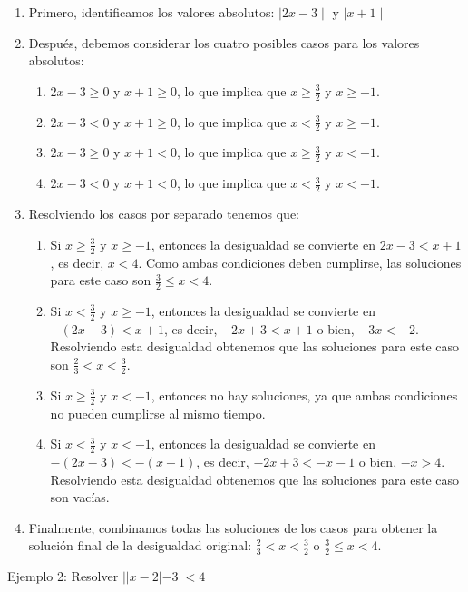 \documentclass[a4paper,12pt]{article}
\begin{document}
\begin{enumerate}
	\item Primero, identificamos los valores absolutos: $ \mid 2x - 3 \mid $ y $ \mid x + 1 \mid $
	
	\item Después, debemos considerar los cuatro posibles casos para los valores absolutos:
		\begin{enumerate}
			\item $2x-3\geq0$ y $x+1\geq0$, lo que implica que $x\geq\frac{3}{2}$ y $x\geq-1$.
			\item $2x-3<0$ y $x+1\geq0$, lo que implica que $x<\frac{3}{2}$ y $x\geq-1$.
			\item $2x-3\geq0$ y $x+1<0$, lo que implica que $x\geq\frac{3}{2}$ y $x<-1$.
			\item $2x-3<0$ y $x+1<0$, lo que implica que $x<\frac{3}{2}$ y $x<-1$.
		\end{enumerate}
	
	\item Resolviendo los casos por separado tenemos que:
		\begin{enumerate}
			\item Si $x\geq\frac{3}{2}$ y $x\geq-1$, entonces la desigualdad se convierte en $2x-3<x+1$, es decir, $x<4$. Como ambas condiciones deben cumplirse, las soluciones para este caso son $\frac{3}{2}\leq x<4$.
			\item Si $x<\frac{3}{2}$ y $x\geq-1$, entonces la desigualdad se convierte en $-(2x-3)<x+1$, es decir, $-2x+3<x+1$ o bien, $-3x<-2$. Resolviendo esta desigualdad obtenemos que las soluciones para este caso son $\frac{2}{3}< x< \frac{3}{2}$.
			\item Si $x\geq\frac{3}{2}$ y $x<-1$, entonces no hay soluciones, ya que ambas condiciones no pueden cumplirse al mismo tiempo.
			\item Si $x<\frac{3}{2}$ y $x<-1$, entonces la desigualdad se convierte en $-(2x-3)<-(x+1)$, es decir, $-2x+3<-x-1$ o bien, $-x>4$. Resolviendo esta desigualdad obtenemos que las soluciones para este caso son vacías.
		\end{enumerate}

	\item Finalmente, combinamos todas las soluciones de los casos para obtener la solución final de la desigualdad original: $ \frac{2}{3}< x< \frac{3}{2}$  o  $\frac{3}{2}\leq x<4 $.
		
\end{enumerate}

\vspace{1cm}
	Ejemplo 2: Resolver $| |x-2| - 3 | < 4$
\end{document}
